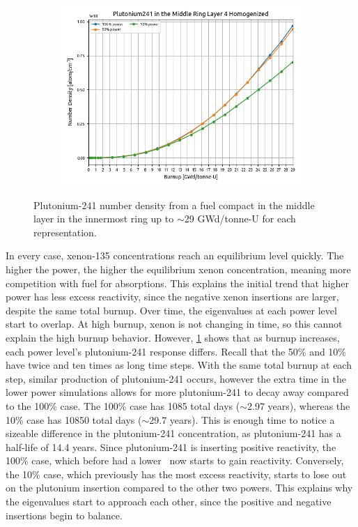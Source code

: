 \documentclass[letterpaper]{physor2024}
\begin{document}
\begin{figure}[!h]
\begin{subfigure}{0.495\linewidth}
        \includegraphics[width=\linewidth]{figures/homogenized_Pu_241.png}
    \end{subfigure}
    \caption{Plutonium-241 number density from a fuel compact in the middle layer in the innermost ring up to $\sim$29 GWd/tonne-U for each representation.}
    \label{fig:plutoniums}
\end{figure}

In every case, xenon-135 concentrations reach an equilibrium level quickly. The higher the power, the higher the equilibrium xenon concentration, meaning more competition with fuel for absorptions. This explains the initial trend that higher power has less excess reactivity, since the negative xenon insertions are larger, despite the same total burnup. Over time, the eigenvalues at each power level start to overlap. At high burnup, xenon is not changing in time, so this cannot explain the high burnup behavior. However, \cref{fig:plutoniums} shows that as burnup increases, each power level's plutonium-241 response differs. Recall that the 50\% and 10\% have twice and ten times as long time steps. With the same total burnup at each step, similar production of plutonium-241 occurs, however the extra time in the lower power simulations allows for more plutonium-241 to decay away compared to the 100\% case. The 100\% case has 1085 total days ($\sim$2.97 years), whereas the 10\% case has 10850 total days ($\sim$29.7 years). This is enough time to notice a sizeable difference in the plutonium-241 concentration, as plutonium-241 has a half-life of 14.4 years. Since plutonium-241 is inserting positive reactivity, the 100\% case, which before had a lower \kinf~now starts to gain reactivity. Conversely, the 10\% case, which previously has the most excess reactivity, starts to lose out on the plutonium insertion compared to the other two powers. This explains why the eigenvalues start to approach each other, since the positive and negative insertions begin to balance.
\end{document}
